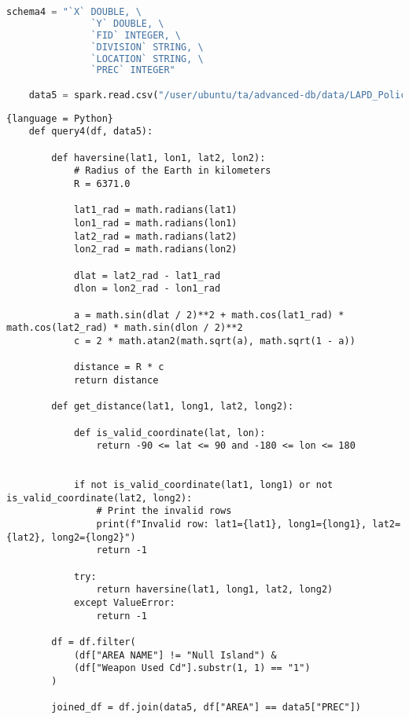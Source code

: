 \documentclass{article}
\begin{document}
\vspace{3mm}

\begin{lstlisting}[language = Python]
    schema4 = "`X` DOUBLE, \
               `Y` DOUBLE, \
               `FID` INTEGER, \
               `DIVISION` STRING, \
               `LOCATION` STRING, \
               `PREC` INTEGER"

    data5 = spark.read.csv("/user/ubuntu/ta/advanced-db/data/LAPD_Police_Stations.csv", header=True, schema=schema4)


\end{lstlisting}
    
\vspace{5mm}

\begin{lstlisting}{language = Python}
    def query4(df, data5):

        def haversine(lat1, lon1, lat2, lon2):
            # Radius of the Earth in kilometers
            R = 6371.0

            lat1_rad = math.radians(lat1)
            lon1_rad = math.radians(lon1)
            lat2_rad = math.radians(lat2)
            lon2_rad = math.radians(lon2)

            dlat = lat2_rad - lat1_rad
            dlon = lon2_rad - lon1_rad

            a = math.sin(dlat / 2)**2 + math.cos(lat1_rad) * math.cos(lat2_rad) * math.sin(dlon / 2)**2
            c = 2 * math.atan2(math.sqrt(a), math.sqrt(1 - a))

            distance = R * c
            return distance

        def get_distance(lat1, long1, lat2, long2):

            def is_valid_coordinate(lat, lon):
                return -90 <= lat <= 90 and -180 <= lon <= 180


            if not is_valid_coordinate(lat1, long1) or not is_valid_coordinate(lat2, long2):
                # Print the invalid rows
                print(f"Invalid row: lat1={lat1}, long1={long1}, lat2={lat2}, long2={long2}")
                return -1

            try:
                return haversine(lat1, long1, lat2, long2)
            except ValueError:
                return -1

        df = df.filter(
            (df["AREA NAME"] != "Null Island") &
            (df["Weapon Used Cd"].substr(1, 1) == "1")
        )

        joined_df = df.join(data5, df["AREA"] == data5["PREC"])


\end{lstlisting}
\end{document}
